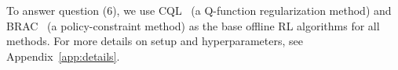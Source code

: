 To answer question (6), we use CQL~\citep{kumar2020conservative} (a Q-function regularization method) and BRAC~\citep{wu2019behavior} (a policy-constraint method) as the base offline RL algorithms for all methods.  
For more details on setup and hyperparameters, see Appendix~\ref{app:details}.


